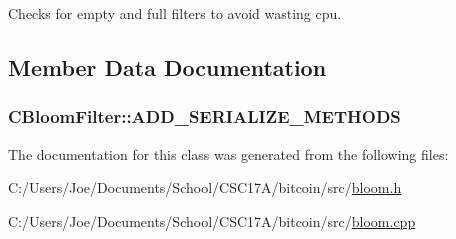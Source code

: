 Checks for empty and full filters to avoid wasting cpu. 



\subsection{Member Data Documentation}
\hypertarget{class_c_bloom_filter_aac1b6a065059e07177ec836929190ad0}{}
\subsubsection[{A\+D\+D\+\_\+\+S\+E\+R\+I\+A\+L\+I\+Z\+E\+\_\+\+M\+E\+T\+H\+O\+D\+S}]{\setlength{\rightskip}{0pt plus 5cm}C\+Bloom\+Filter\+::\+A\+D\+D\+\_\+\+S\+E\+R\+I\+A\+L\+I\+Z\+E\+\_\+\+M\+E\+T\+H\+O\+D\+S}\label{class_c_bloom_filter_aac1b6a065059e07177ec836929190ad0}


The documentation for this class was generated from the following files\+:\begin{DoxyCompactItemize}
\item 
C\+:/\+Users/\+Joe/\+Documents/\+School/\+C\+S\+C17\+A/bitcoin/src/\hyperlink{bloom_8h}{bloom.\+h}\item 
C\+:/\+Users/\+Joe/\+Documents/\+School/\+C\+S\+C17\+A/bitcoin/src/\hyperlink{bloom_8cpp}{bloom.\+cpp}\end{DoxyCompactItemize}
